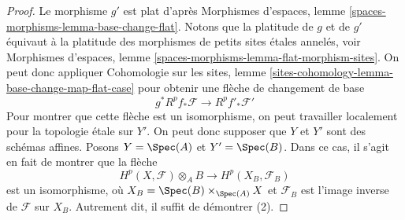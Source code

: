 \begin{proof}
Le morphisme $g'$ est plat d'après
Morphismes d'espaces, lemme \ref{spaces-morphisms-lemma-base-change-flat}.
Notons que la platitude de $g$ et de $g'$ équivaut à la platitude
des morphismes de petits sites étales annelés, voir
Morphismes d'espaces, lemme \ref{spaces-morphisms-lemma-flat-morphism-sites}.
On peut donc appliquer
Cohomologie sur les sites, lemme
\ref{sites-cohomology-lemma-base-change-map-flat-case}
pour obtenir une flèche de changement de base
$$
g^*R^pf_*\mathcal{F} \longrightarrow R^pf'_*\mathcal{F}'
$$
Pour montrer que cette flèche est un isomorphisme, on peut travailler localement pour la
topologie étale sur $Y'$. On peut donc supposer que $Y$ et $Y'$ sont des schémas
affines. Posons $Y = \Spec(A)$ et $Y' = \Spec(B)$.
Dans ce cas, il s'agit en fait de montrer que la flèche
$$
H^p(X, \mathcal{F}) \otimes_A B \longrightarrow H^p(X_B, \mathcal{F}_B)
$$
est un isomorphisme, où $X_B = \Spec(B) \times_{\Spec(A)} X$ et
$\mathcal{F}_B$ est l'image inverse de $\mathcal{F}$ sur $X_B$.
Autrement dit, il suffit de démontrer (2).


\end{proof}

